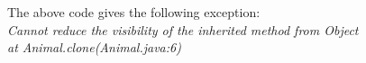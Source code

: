 The above code gives the following exception: \\
\textit{Cannot reduce the visibility of the inherited method from Object\\
at Animal.clone(Animal.java:6)}